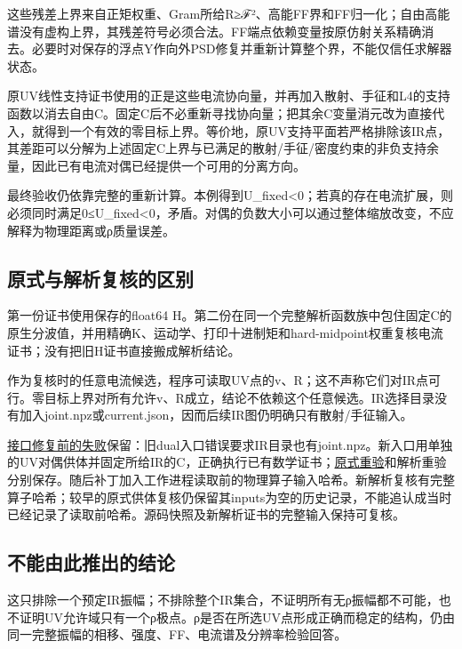 \documentclass[
  10pt,
  a4paper,
]{article}
\begin{document}
这些残差上界来自正矩权重、Gram所给R≥\textbar ℱ\textbar²、高能FF界和FF归一化；自由高能谱没有虚构上界，其残差符号必须合法。FF端点依赖变量按原仿射关系精确消去。必要时对保存的浮点Y作向外PSD修复并重新计算整个界，不能仅信任求解器状态。

原UV线性支持证书使用的正是这些电流协向量，并再加入散射、手征和L4的支持函数以消去自由C。固定C后不必重新寻找协向量；把其余C变量消元改为直接代入，就得到一个有效的零目标上界。等价地，原UV支持平面若严格排除该IR点，其差距可以分解为上述固定C上界与已满足的散射/手征/密度约束的非负支持余量，因此已有电流对偶已经提供一个可用的分离方向。

最终验收仍依靠完整的重新计算。本例得到U\_fixed\textless0；若真的存在电流扩展，则必须同时满足0≤U\_fixed\textless0，矛盾。对偶的负数大小可以通过整体缩放改变，不应解释为物理距离或ρ质量误差。

\subsection{原式与解析复核的区别}\label{ux539fux5f0fux4e0eux89e3ux6790ux590dux6838ux7684ux533aux522b}

第一份证书使用保存的float64
H。第二份在同一个完整解析函数族中包住固定C的原生分波值，并用精确K、运动学、打印十进制矩和hard-midpoint权重复核电流证书；没有把旧H证书直接搬成解析结论。

作为复核时的任意电流候选，程序可读取UV点的v、R；这不声称它们对IR点可行。零目标上界对所有允许v、R成立，结论不依赖这个任意候选。IR选择目录没有加入joint.npz或current.json，因而后续IR图仍明确只有散射/手征输入。

\href{../fixed_IR_dual_before_fix/report.json}{接口修复前的失败}保留：旧dual入口错误要求IR目录也有joint.npz。新入口用单独的UV对偶供体并固定所给IR的C，正确执行已有数学证书；\href{../interlaced_fixed_IR_dual/report.json}{原式重验}和解析重验分别保存。随后补丁加入工作进程读取前的物理算子输入哈希。新解析复核有完整算子哈希；较早的原式供体复核仍保留其inputs为空的历史记录，不能追认成当时已经记录了读取前哈希。源码快照及新解析证书的完整输入保持可复核。

\subsection{不能由此推出的结论}\label{ux4e0dux80fdux7531ux6b64ux63a8ux51faux7684ux7ed3ux8bba}

这只排除一个预定IR振幅；不排除整个IR集合，不证明所有无ρ振幅都不可能，也不证明UV允许域只有一个ρ极点。ρ是否在所选UV点形成正确而稳定的结构，仍由同一完整振幅的相移、强度、FF、电流谱及分辨率检验回答。
\end{document}
